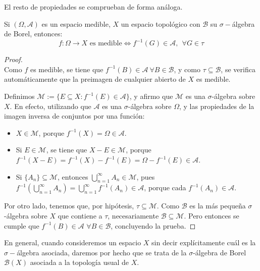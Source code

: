 El resto de propiedades se comprueban de forma análoga.

\begin{nprop}Si $(\Omega,\mathscr A)$ es un espacio medible, $X$ un espacio topológico con $\mathcal B$ su $\sigma-$álgebra de Borel, entonces:
  \[
    f: \Omega \to X \text{ es medible} \iff f^{-1}(G) \in \mathscr A, \ \ \forall G \in \tau
  \]
\end{nprop}

  \begin{proof} \hfill \\
	\boxed{\Rightarrow} Como $f$ es medible, se tiene que $f^{-1}(B) \in \mathscr A \ \forall B \in \mathcal B$, y como $\tau \subseteq \mathcal B$, se verifica automáticamente que la preimagen de cualquier abierto de $X$ es medible.

\boxed{\Leftarrow} Definimos $\mathcal M := \{ E \subseteq X: f^{-1}(E) \in \mathscr A\}$, y afirmo que $\mathcal M$ es una $\sigma$-álgebra sobre $X$. En efecto, utilizando que $\mathscr A$ es una $\sigma$-álgebra sobre $\Omega$, y las propiedades de la imagen inversa de conjuntos por una función:

\begin{itemize}
	\item $X \in \mathcal M$, porque $f^{-1}(X) = \Omega \in \mathscr A$.

    \item Si $E \in \mathcal M$, se tiene que $X - E \in \mathcal M$, porque $f^{-1}(X-E) = f^{-1}(X) - f^{-1}(E) = \Omega - f^{-1}(E) \in \mathscr A$.

    \item Si $\{A_n\} \subseteq \mathcal M$, entonces $\bigcup_{n=1}^\infty A_n \in \mathcal M$, pues $f^{-1}\left( \bigcup_{n=1}^\infty A_n \right) = \bigcup_{n=1}^\infty f^{-1}(A_n) \in \mathscr A$, porque cada $f^{-1}(A_n) \in \mathscr A$.
\end{itemize}

Por otro lado, tenemos que, por hipótesis, $\tau \subseteq \mathcal M$. Como $\mathcal B$ es la más pequeña $\sigma$-álgebra sobre $X$ que contiene a $\tau$, necesariamente $\mathcal B \subseteq \mathcal M$. Pero entonces se cumple que \mbox{$f^{-1}(B) \in \mathscr A$} $\forall B \in \mathcal B$, concluyendo la prueba.
\end{proof}

En general, cuando consideremos un espacio $X$ sin decir explícitamente cuál es la $\sigma-$álgebra asociada, daremos por hecho que se trata de la $\sigma$-álgebra de Borel $\mathcal B(X)$ asociada a la topología usual de $X$.

